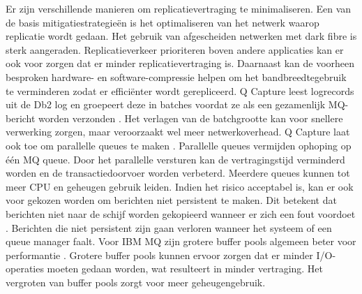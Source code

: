 Er zijn verschillende manieren om replicatievertraging te minimaliseren.
Een van de basis mitigatiestrategieën is het optimaliseren van het netwerk waarop replicatie wordt gedaan.
Het gebruik van afgescheiden netwerken met dark fibre is sterk aangeraden.
Replicatieverkeer prioriteren boven andere applicaties kan er ook voor zorgen dat er minder replicatievertraging is.
Daarnaast kan de voorheen besproken hardware- en software-compressie helpen om het bandbreedtegebruik te verminderen zodat er efficiënter wordt gerepliceerd.
Q Capture leest logrecords uit de Db2 log en groepeert deze in batches voordat ze als een gezamenlijk MQ-bericht worden verzonden \autocite{ibm_2025_infosphere_batch_frequency_param}.
Het verlagen van de batchgrootte kan voor snellere verwerking zorgen, maar veroorzaakt wel meer netwerkoverhead.
Q Capture laat ook toe om parallelle queues te maken \autocite{ibm_2026_infosphere_parallel_send_queues}.
Parallelle queues vermijden ophoping op één MQ queue.
Door het parallelle versturen kan de vertragingstijd verminderd worden en de transactiedoorvoer worden verbeterd.
Meerdere queues kunnen tot meer CPU en geheugen gebruik leiden.
Indien het risico acceptabel is, kan er ook voor gekozen worden om berichten niet persistent te maken.
Dit betekent dat berichten niet naar de schijf worden gekopieerd wanneer er zich een fout voordoet \autocite{ibm_2025_ensuring_messages_not_lost_mq}.
Berichten die niet persistent zijn gaan verloren wanneer het systeem of een queue manager faalt.
Voor IBM MQ zijn grotere buffer pools algemeen beter voor performantie \textcite{ibm_2026_ibm_defining_buffer_pools}.
Grotere buffer pools kunnen ervoor zorgen dat er minder I/O-operaties moeten gedaan worden, wat resulteert in minder vertraging.
Het vergroten van buffer pools zorgt voor meer geheugengebruik.

\subsection{}
\label{sec:asynchrone-log-replicatie-long-running-logical-units-of-work}

